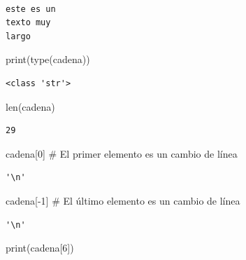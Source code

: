 \documentclass[
  spanish,
  letterpaper,
]{scrbook}
\newenvironment{Shaded}{\begin{snugshade}}{\end{snugshade}}
\newcommand{\BuiltInTok}[1]{\textcolor[rgb]{0.00,0.23,0.31}{#1}}
\newcommand{\CommentTok}[1]{\textcolor[rgb]{0.37,0.37,0.37}{#1}}
\newcommand{\DecValTok}[1]{\textcolor[rgb]{0.68,0.00,0.00}{#1}}
\newcommand{\NormalTok}[1]{\textcolor[rgb]{0.00,0.23,0.31}{#1}}
\newcommand{\OperatorTok}[1]{\textcolor[rgb]{0.37,0.37,0.37}{#1}}
\theoremstyle{definition}
\theoremstyle{remark}
\begin{document}
\begin{verbatim}

este es un 
texto muy
largo
\end{verbatim}

\begin{Shaded}
\begin{Highlighting}[]
\BuiltInTok{print}\NormalTok{(}\BuiltInTok{type}\NormalTok{(cadena))}
\end{Highlighting}
\end{Shaded}

\begin{verbatim}
<class 'str'>
\end{verbatim}

\begin{Shaded}
\begin{Highlighting}[]
\BuiltInTok{len}\NormalTok{(cadena)}
\end{Highlighting}
\end{Shaded}

\begin{verbatim}
29
\end{verbatim}

\begin{Shaded}
\begin{Highlighting}[]
\NormalTok{cadena[}\DecValTok{0}\NormalTok{] }\CommentTok{\# El primer elemento es un cambio de línea}
\end{Highlighting}
\end{Shaded}

\begin{verbatim}
'\n'
\end{verbatim}

\begin{Shaded}
\begin{Highlighting}[]
\NormalTok{cadena[}\OperatorTok{{-}}\DecValTok{1}\NormalTok{] }\CommentTok{\# El último elemento es un cambio de línea}
\end{Highlighting}
\end{Shaded}

\begin{verbatim}
'\n'
\end{verbatim}

\begin{Shaded}
\begin{Highlighting}[]
\BuiltInTok{print}\NormalTok{(cadena[}\DecValTok{6}\NormalTok{])}
\end{Highlighting}
\end{Shaded}
\end{document}
